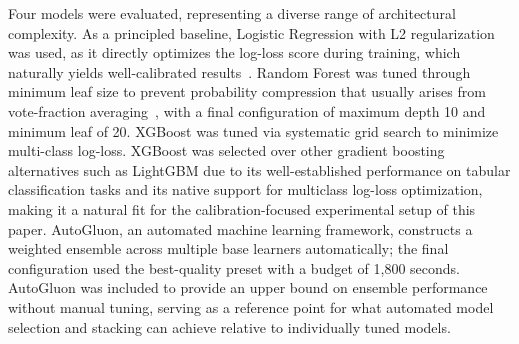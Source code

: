\documentclass[conference]{IEEEtran}
\begin{document}
Four models were evaluated, representing a diverse range
of architectural complexity. As a principled baseline, Logistic
Regression with L2 regularization was used, as it directly
optimizes the log-loss score during training, which naturally
yields well-calibrated results~\cite{b6}. Random Forest was tuned
through minimum leaf size to prevent probability compression
that usually arises from vote-fraction averaging~\cite{b12}, with a
final configuration of maximum depth 10 and minimum leaf
of 20. XGBoost was tuned via systematic grid search to minimize
multi-class log-loss.
XGBoost was selected over other gradient boosting alternatives
such as LightGBM due to its well-established performance on
tabular classification tasks and its native support for
multiclass log-loss optimization, making it a natural fit for
the calibration-focused experimental setup of this paper.
AutoGluon, an automated machine learning framework, constructs
a weighted ensemble across multiple base learners automatically;
the final configuration used the best-quality preset with a
budget of 1,800 seconds.
AutoGluon was included to provide an upper bound on ensemble
performance without manual tuning, serving as a reference point
for what automated model selection and stacking can achieve
relative to individually tuned models.
\end{document}
